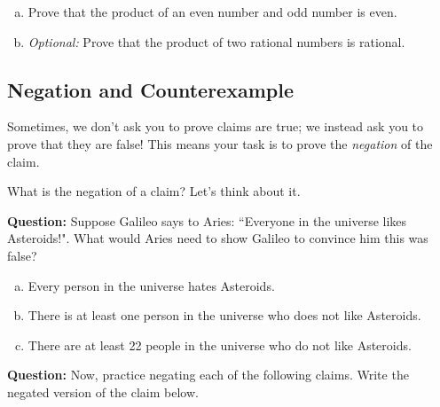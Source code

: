 \documentclass[12pt,letterpaper]{article}
\begin{document}
      \begin{enumerate}[a.]
        \item Prove that the product of an even number and odd number is even. 

        \begin{mdframed}
        \vspace{1.5cm}
        \end{mdframed}
		
        \item \textit{Optional:} Prove that the product of two rational numbers is rational.

        \begin{mdframed} \vspace{1.5cm} \end{mdframed}

      \end{enumerate}

      \subsection*{Negation and Counterexample}

      Sometimes, we don't ask you to prove claims are true; we instead ask you to prove that they are false! This means your task is to prove the \textit{negation} of the claim. 

      What is the negation of a claim? Let's think about it. 
      
      \textbf{Question:} Suppose Galileo says to Aries: ``Everyone in the universe likes Asteroids!". What would Aries need to show Galileo to convince him this was false?

      \begin{enumerate}[(a)]
      \item Every person in the universe hates Asteroids. 
      \item There is at least one person in the universe who does not like Asteroids.
      \item There are at least 22 people in the universe who do not like Asteroids. 
      \end{enumerate}
      
      \begin{mdframed} \vspace{0.5cm} \end{mdframed}

      \textbf{Question:} Now, practice negating each of the following claims. Write the negated version of the claim below.
\end{document}
